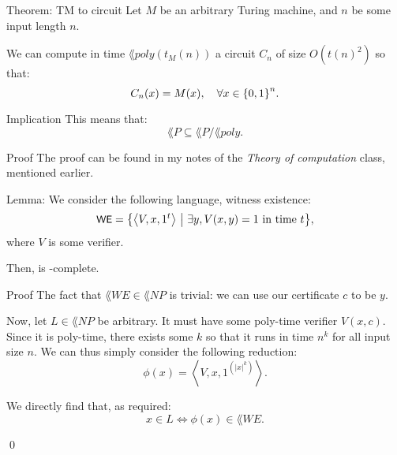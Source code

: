 \documentclass[a4paper]{article}
\begin{document}
\begin{parag}{Theorem: TM to circuit}
    Let $M$ be an arbitrary Turing machine, and $n$ be some input length $n$.

    We can compute in time $\lang{poly}\left(t_M\left(n\right)\right)$ a circuit $C_n$ of size $O\left(t\left(n\right)^2\right)$ so that: 
    \[C_n\left(x\right) = M\left(x\right), \mathspace \forall x \in \left\{0, 1\right\}^n.\]

    \begin{subparag}{Implication}
        This means that: 
        \[\lang{P} \subseteq \lang{P}/\lang{poly}.\]
    \end{subparag}

    \begin{subparag}{Proof}
        The proof can be found in my notes of the \textit{Theory of computation} class, mentioned earlier.
    \end{subparag}
\end{parag}

\begin{parag}{Lemma: }
    We consider the following language, witness existence: 
    \[\lang{WE} = \left\{\left\langle V, x, 1^t \right\rangle \suchthat \exists y, V\left(x, y\right) = 1 \text{ in time $t$}\right\},\]
    where $V$ is some verifier.

    Then,  is -complete.

    \begin{subparag}{Proof}
        The fact that $\lang{WE} \in \lang{NP}$ is trivial: we can use our certificate $c$ to be $y$. 

        Now, let $L \in \lang{NP}$ be arbitrary. It must have some poly-time verifier $V\left(x, c\right)$. Since it is poly-time, there exists some $k$ so that it runs in time $n^k$ for all input size $n$. We can thus simply consider the following reduction: 
        \[\phi\left(x\right) = \left\langle V, x, 1^{\left(\left|x\right|^k\right)} \right\rangle.\]

        We directly find that, as required:
        \[x \in L \iff \phi\left(x\right) \in \lang{WE}.\]
        
        \qed
    \end{subparag}
\end{parag}
\end{document}
